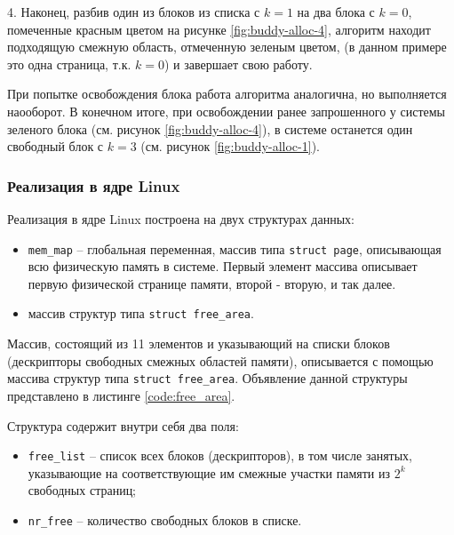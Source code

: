 4. Наконец, разбив один из блоков из списка с $k = 1$ на два блока с $k = 0$, помеченные красным цветом на рисунке \ref{fig:buddy-alloc-4}, алгоритм находит подходящую смежную область, отмеченную зеленым цветом, (в данном примере это одна страница, т.к. $k = 0$) и завершает свою работу.

При попытке освобождения блока работа алгоритма аналогична, но выполняется наооборот. В конечном итоге, при освобождении ранее запрошенного у системы зеленого блока (см. рисунок \ref{fig:buddy-alloc-4}), в системе останется один свободный блок с $k = 3$ (см. рисунок \ref{fig:buddy-alloc-1}).

\subsubsection{Реализация в ядре Linux}

Реализация в ядре Linux построена на двух структурах данных:

\begin{itemize}
	\item \texttt{mem\_map} -- глобальная переменная, массив типа \texttt{struct page}, описывающая всю физическую память в системе. Первый элемент массива описывает первую физической странице памяти, второй - вторую, и так далее.
	\item массив структур типа \texttt{struct free\_area}.
\end{itemize}

Массив, состоящий из 11 элементов и указывающий на списки блоков (дескрипторы свободных смежных областей памяти), описывается с помощью массива структур типа \texttt{struct free\_area}. Объявление данной структуры представлено в листинге \ref{code:free_area}.


Структура содержит внутри себя два поля:

\begin{itemize}
	\item \texttt{free\_list} -- список всех блоков (дескрипторов), в том числе занятых, указывающие на соответствующие им смежные участки памяти из $2^k$ свободных страниц;
	\item \texttt{nr\_free} -- количество свободных блоков в списке.
\end{itemize}

